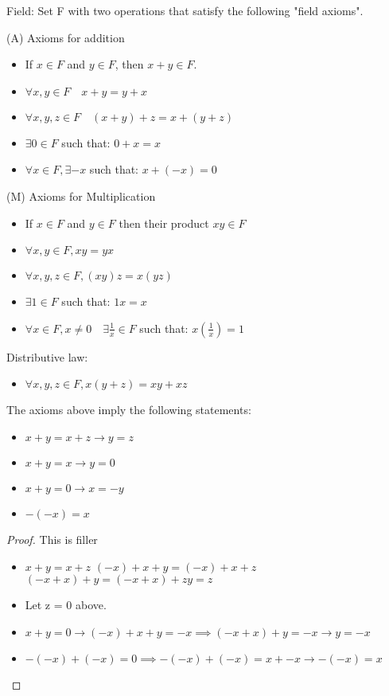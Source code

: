 \documentclass[12pt, letterpaper]{paper}
\begin{document}
Field: Set F with two operations that satisfy the following "field
axioms".

(A) Axioms for addition
\begin{itemize}
\item If $x \in F$ and $y \in F$, then $x + y \in F$.
\item $\forall x,y \in F \quad x + y = y + x$
\item $\forall x,y,z \in F \quad ( x + y ) + z = x + (y+z)$
\item $\exists0 \in F$ such that: $0 + x = x$
\item $\forall x \in F, \exists -x$ such that: $x + (-x) = 0$
\end{itemize}

(M) Axioms for Multiplication
\begin{itemize}
\item If $x \in F$ and $y \in F$ then their product $xy \in F$
\item $\forall x,y \in F, xy = yx$
\item $\forall x,y,z \in F, (xy)z = x(yz)$
\item $\exists 1 \in F$ such that: $1x = x$
\item $\forall x \in F, x \neq 0 \quad \exists \frac{1}{x} \in F$ such
  that: $x (\frac{1}{x}) = 1$
\end{itemize}

Distributive law:
\begin{itemize}
\item $\forall x,y,z \in F, x(y+z) = xy + xz$
\end{itemize}

\vspace{ .33in }

The axioms above imply the following statements:
\begin{itemize}
\item $x+y = x+z \to y = z$
\item $x + y = x \to y = 0$
\item $x+y = 0 \to x = -y$
\item $-(-x) = x$
\end{itemize}

\begin{proof} This is filler\newline
  \begin{itemize}
  \item $x + y = x + z$ \newline $(-x) + x + y = (-x) + x + z$
    \newline $( -x + x ) + y = (-x + x ) + z$\newline $y = z$
  \item Let z = 0 above.
  \item
    $x+y = 0 \to (-x) + x + y = -x \implies (-x + x) + y = -x \to y =
    -x$
  \item
    $-(-x) + (-x) = 0 \implies -(-x) + (-x) = x + -x \to -(-x) = x$
  \end{itemize}
\end{proof}
\end{document}

